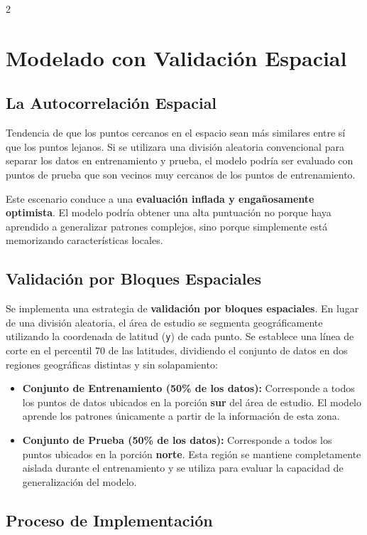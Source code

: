 \documentclass[a4paper,10pt]{article}
\begin{document}
\begin{multicols}{2}
\section{Modelado con Validación Espacial}

\subsection{La Autocorrelación Espacial}

Tendencia de que los puntos cercanos en el espacio sean más similares entre sí que los puntos lejanos. Si se utilizara una división aleatoria convencional para separar los datos en entrenamiento y prueba, el modelo podría ser evaluado con puntos de prueba que son vecinos muy cercanos de los puntos de entrenamiento.

Este escenario conduce a una \textbf{evaluación inflada y engañosamente optimista}. El modelo podría obtener una alta puntuación no porque haya aprendido a generalizar patrones complejos, sino porque simplemente está memorizando características locales. 

\subsection{Validación por Bloques Espaciales}

Se implementa una estrategia de \textbf{validación por bloques espaciales}. En lugar de una división aleatoria, el área de estudio se segmenta geográficamente utilizando la coordenada de latitud (\texttt{y}) de cada punto. Se establece una línea de corte en el percentil 70 de las latitudes, dividiendo el conjunto de datos en dos regiones geográficas distintas y sin solapamiento:

\begin{itemize}
    \item \textbf{Conjunto de Entrenamiento (50\% de los datos):} Corresponde a todos los puntos de datos ubicados en la porción \textbf{sur} del área de estudio. El modelo aprende los patrones únicamente a partir de la información de esta zona.

    \item \textbf{Conjunto de Prueba (50\% de los datos):} Corresponde a todos los puntos ubicados en la porción \textbf{norte}. Esta región se mantiene completamente aislada durante el entrenamiento y se utiliza para evaluar la capacidad de generalización del modelo.
\end{itemize}

\subsection{Proceso de Implementación}


\end{multicols}
\end{document}
